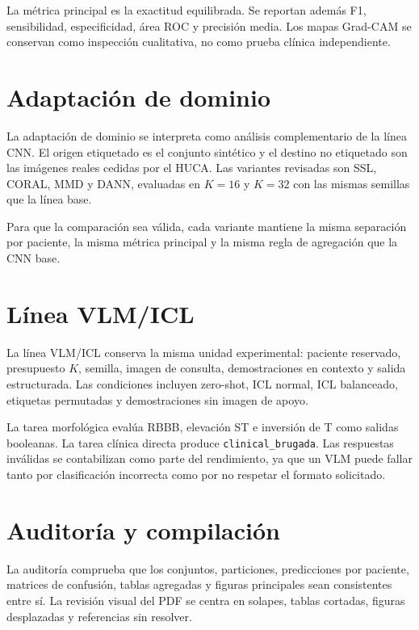 La métrica principal es la exactitud equilibrada. Se reportan además F1, sensibilidad, especificidad, área ROC y precisión media. Los mapas Grad-CAM se conservan como inspección cualitativa, no como prueba clínica independiente.

\section{Adaptación de dominio}

La adaptación de dominio se interpreta como análisis complementario de la línea CNN. El origen etiquetado es el conjunto sintético y el destino no etiquetado son las imágenes reales cedidas por el HUCA. Las variantes revisadas son SSL, CORAL, MMD y DANN, evaluadas en \(K=16\) y \(K=32\) con las mismas semillas que la línea base.

Para que la comparación sea válida, cada variante mantiene la misma separación por paciente, la misma métrica principal y la misma regla de agregación que la CNN base.

\section{Línea VLM/ICL}

La línea VLM/ICL conserva la misma unidad experimental: paciente reservado, presupuesto \(K\), semilla, imagen de consulta, demostraciones en contexto y salida estructurada. Las condiciones incluyen zero-shot, ICL normal, ICL balanceado, etiquetas permutadas y demostraciones sin imagen de apoyo.

La tarea morfológica evalúa RBBB, elevación ST e inversión de T como salidas booleanas. La tarea clínica directa produce \texttt{clinical\_brugada}. Las respuestas inválidas se contabilizan como parte del rendimiento, ya que un VLM puede fallar tanto por clasificación incorrecta como por no respetar el formato solicitado.

\section{Auditoría y compilación}

La auditoría comprueba que los conjuntos, particiones, predicciones por paciente, matrices de confusión, tablas agregadas y figuras principales sean consistentes entre sí. La revisión visual del PDF se centra en solapes, tablas cortadas, figuras desplazadas y referencias sin resolver.
